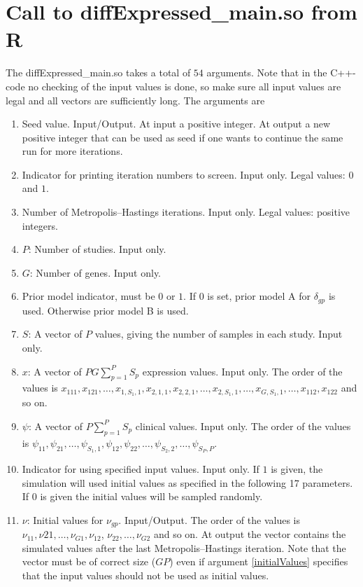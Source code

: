 \documentclass[11pt]{article}
\begin{document}
\section{Call to diffExpressed\_main.so from R}
The diffExpressed\_main.so takes a total of $54$ arguments. Note that in the C++-code
no checking of the input values is done, so make sure all input values are legal
and all vectors are sufficiently long. The arguments are
\begin{enumerate}
\item Seed value. Input/Output. At input a positive integer. At output a new positive 
integer that can be used as seed if one wants to continue the same run for more 
iterations.
\item Indicator for printing iteration numbers to screen. Input only. Legal values: $0$ and $1$.
\item Number of Metropolis--Hastings iterations. Input only. Legal values: positive integers.
\item $P$: Number of studies. Input only.
\item $G$: Number of genes. Input only.
\item Prior model indicator, must be $0$ or $1$. If $0$ is set, prior model A for $\delta_{gp}$ is used. Otherwise
prior model B is used.
\item $S$: A vector of $P$ values, giving the number of samples in each study. Input only.
\item $x$: A vector of $PG\sum_{p=1}^P S_p$ expression values. Input only. The order of the
values is $x_{111},x_{121},\ldots,x_{1,S_1,1},x_{2,1,1},x_{2,2,1},\ldots,x_{2,S_1,1},\ldots,
x_{G,S_1,1},\ldots,x_{112},x_{122}$ and so on.
\item $\psi$: A vector of $P\sum_{p=1}^P S_p$ clinical values. Input only. The order 
of the values is $\psi_{11},\psi_{21},\ldots,\psi_{S_1,1},\psi_{12},\psi_{22},\ldots,
\psi_{S_2,2},\ldots,\psi_{S_P,P}$.
\item \label{initialValues}Indicator for using specified input values. Input only. If $1$ is given, the 
simulation will used initial values as specified in the following 17 parameters. If $0$
is given the initial values will be sampled randomly.

\item $\nu$: Initial values for $\nu_{gp}$. Input/Output. The order of the values is
$\nu_{11},\nu{21},\ldots,\nu_{G1},\nu_{12}$, $\nu_{22},\ldots,\nu_{G2}$ and so on. At output
the vector contains the simulated values after the last Metropolis--Hastings iteration.
Note that the vector must be of correct size ($GP$) even if argument \ref{initialValues} specifies
that the input values should not be used as initial values.


\end{enumerate}
\end{document}
